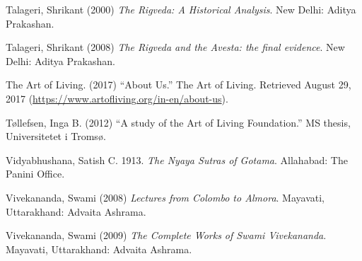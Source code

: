 \begin{thebibliography}{99}
  Talageri, Shrikant (2000) \textit{The Rigveda: A Historical Analysis}. New Delhi: Aditya Prakashan.

  Talageri, Shrikant (2008) \textit{The Rigveda and the Avesta: the final evidence}. New Delhi: Aditya Prakashan.

  The Art of Living. (2017) “About Us.” The Art of Living. Retrieved August 29, 2017 (\url{https://www.artofliving.org/in-en/about-us}).

  Tøllefsen, Inga B. (2012) “A study of the Art of Living Foundation.” MS thesis, Universitetet i Tromsø.

  Vidyabhushana, Satish C. 1913. \textit{The Nyaya Sutras of Gotama}. Allahabad: The Panini Office.

  Vivekananda, Swami (2008) \textit{Lectures from Colombo to Almora}. Mayavati, Uttarakhand: Advaita Ashrama.

  Vivekananda, Swami (2009) \textit{The Complete Works of Swami Vivekananda}. Mayavati, Uttarakhand: Advaita Ashrama.

 \end{thebibliography}


